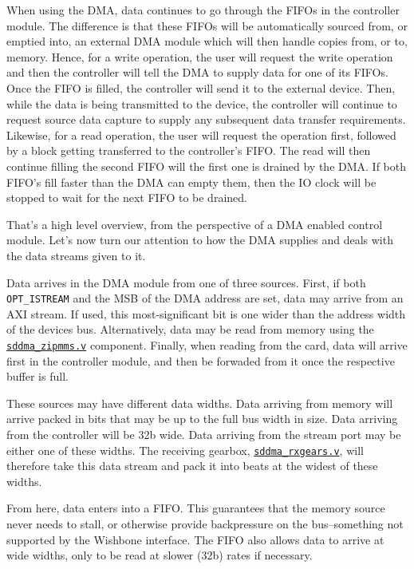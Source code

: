 \documentclass{gqtekspec}
\newcommand{\zhref}[2]{\href{#1}{\textcolor{dkblue}{#2}}}
\begin{document}
When using the DMA, data continues to go through the FIFOs in the controller
module.  The difference is that these FIFOs will be automatically sourced
from, or emptied into, an external DMA module which will then handle copies
from, or to, memory.  Hence, for a write operation, the user will request
the write operation and then the controller will tell the DMA to supply data
for one of its FIFOs.  Once the FIFO is filled, the controller will send it
to the external device.  Then, while the data is being transmitted to the
device, the controller will continue to request source data capture to supply
any subsequent data transfer requirements.  Likewise, for a read operation,
the user will request the operation first, followed by a block getting
transferred to the controller's FIFO.  The read will then continue filling
the second FIFO will the first one is drained by the DMA.  If both FIFO's
fill faster than the DMA can empty them, then the IO clock will be stopped
to wait for the next FIFO to be drained.

That's a high level overview, from the perspective of a DMA enabled control
module.  Let's now turn our attention to how the DMA supplies and deals
with the data streams given to it.

Data arrives in the DMA module from one of three sources.  First, if
both {\tt OPT\_ISTREAM} and the MSB of the DMA address are set, data may
arrive from an AXI stream.  If used, this most-significant bit is one wider
than the address width of the devices bus.  Alternatively, data may be read
from memory using the \zhref{../rtl/sddma\_zipmms.v}{\tt sddma\_zipmms.v}
component.  Finally, when reading from the card, data will arrive first in the
controller module, and then be forwaded from it once the respective buffer
is full.

These sources may have different data widths.  Data arriving from memory will
arrive packed in bits that may be up to the full bus width in size.  Data
arriving from the controller will be 32b wide.  Data arriving from the
stream port may be either one of these widths.  The receiving gearbox,
\zhref{../rtl/sddma\_rxgears.v}{\tt sddma\_rxgears.v}, will therefore take this
data stream and pack it into beats at the widest of these widths.

From here, data enters into a FIFO.  This guarantees that the memory source
never needs to stall, or otherwise provide backpressure on the bus--something
not supported by the Wishbone interface.  The FIFO also allows data to arrive
at wide widths, only to be read at slower (32b) rates if necessary.
\end{document}

